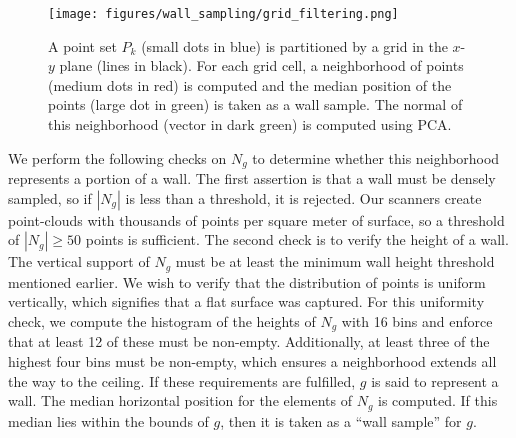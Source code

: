 \documentclass[10pt,twocolumn,letterpaper]{article}
\begin{document}
\begin{figure}[t]

\begin{minipage}[b]{1.0\linewidth}
  \centering
  \centerline{\texttt{[image: figures/wall\_sampling/grid\_filtering.png]}}
\end{minipage}

\caption{A point set $P_k$ (small dots in blue) is partitioned by a grid in the $x$-$y$ plane (lines in black).  For each grid cell, a neighborhood of points (medium dots in red) is computed and the median position of the points (large dot in green) is taken as a wall sample.  The normal of this neighborhood (vector in dark green) is computed using PCA.}
\label{fig:grid_filtering}

\end{figure}





We perform the following checks on $N_g$ to determine whether this neighborhood represents a portion of a wall.  The first assertion is that a wall must be densely sampled, so if $|N_g|$ is less than a threshold, it is rejected. Our scanners create point-clouds with thousands of points per square meter of surface, so a threshold of $|N_g| \geq 50$ points is sufficient.  The second check is to verify the height of a wall.  The vertical support of $N_g$ must be at least the minimum wall height threshold mentioned earlier.  We wish to verify that the distribution of points is uniform vertically, which signifies that a flat surface was captured.  For this uniformity check, we compute the histogram of the heights of $N_g$ with 16 bins and enforce that at least 12 of these must be non-empty.  Additionally, at least three of the highest four bins must be non-empty, which ensures a neighborhood extends all the way to the ceiling.  If these requirements are fulfilled, $g$ is said to represent a wall.  The median horizontal position for the elements of $N_g$ is computed.  If this median lies within the bounds of $g$, then it is taken as a ``wall sample'' for $g$.
\end{document}
